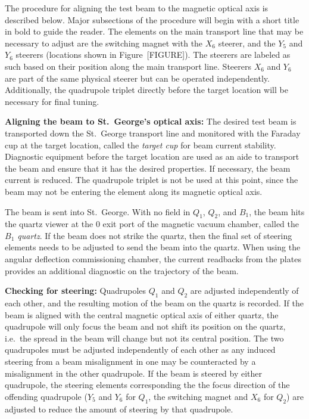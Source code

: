 The procedure for aligning the test beam to the magnetic optical axis is
described below. Major subsections of the procedure will begin with a short
title in bold to guide the reader. The elements on the main transport line that
may be necessary
to adjust are the switching magnet with the $X_6$ steerer, and the $Y_5$ and
$Y_6$ steerers (locations shown in Figure~[FIGURE]). The steerers are labeled
as such based on their position along
the main transport line. Steerers $X_6$ and $Y_6$ are part of the same physical
steerer but can be operated independently. Additionally, the quadrupole triplet
directly before the target location will be necessary for final tuning.

\textbf{Aligning the beam to St.\ George's optical axis:}
The desired test beam is transported down the St.\ George transport line and
monitored with the Faraday cup at the target location, called the
\emph{target cup} for beam current stability. Diagnostic equipment before the
target location are used as an aide to transport the beam and ensure that it
has the desired properties. If necessary, the beam current is reduced. The
quadrupole triplet is not be used at this point, since the beam may not be
entering the element along its magnetic optical axis.

The beam is sent into St.\ George. With no field in $Q_1$, $Q_2$, and $B_1$,
the beam hits the quartz viewer at the 0\degree{} exit port of the magnetic
vacuum chamber, called the \emph{$B_1$ quartz}. If the beam does not strike the
quartz, then the final set of steering elements needs to be adjusted to send
the beam into the quartz. When using the angular deflection commissioning
chamber, the current readbacks from the plates provides an additional
diagnostic on the trajectory of the beam.

\textbf{Checking for steering:}
Quadrupoles $Q_1$ and $Q_2$ are adjusted independently of each other, and the
resulting motion of the beam on the quartz is recorded. If the beam is aligned
with the central magnetic optical axis of either quartz, the quadrupole will
only focus the beam and not shift its position on the quartz, i.e.\ the spread
in the beam will
change but not its central position. The two quadrupoles must be adjusted
independently of each other as any induced steering from a beam misalignment in
one may be counteracted by a misalignment in the other quadrupole. If the beam
is steered by either quadrupole, the steering elements corresponding the the
focus direction of the offending quadrupole ($Y_5$ and $Y_6$ for $Q_1$, the
switching magnet and $X_6$ for $Q_2$) are adjusted to reduce the amount of
steering by that quadrupole.

